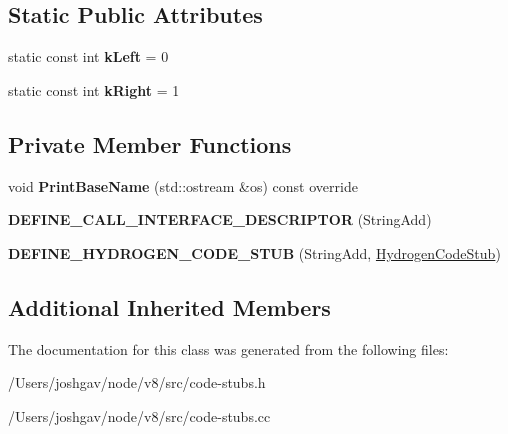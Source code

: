 \subsection*{Static Public Attributes}
\begin{DoxyCompactItemize}
\item 
static const int {\bfseries k\+Left} = 0\hypertarget{classv8_1_1internal_1_1_string_add_stub_aedec92cef9fe651badc00f785613507c}{}\label{classv8_1_1internal_1_1_string_add_stub_aedec92cef9fe651badc00f785613507c}

\item 
static const int {\bfseries k\+Right} = 1\hypertarget{classv8_1_1internal_1_1_string_add_stub_a3ef9ccabf822b5f268695dcef796986e}{}\label{classv8_1_1internal_1_1_string_add_stub_a3ef9ccabf822b5f268695dcef796986e}

\end{DoxyCompactItemize}
\subsection*{Private Member Functions}
\begin{DoxyCompactItemize}
\item 
void {\bfseries Print\+Base\+Name} (std\+::ostream \&os) const  override\hypertarget{classv8_1_1internal_1_1_string_add_stub_a0a40958af7dfdf76e13f60add829154d}{}\label{classv8_1_1internal_1_1_string_add_stub_a0a40958af7dfdf76e13f60add829154d}

\item 
{\bfseries D\+E\+F\+I\+N\+E\+\_\+\+C\+A\+L\+L\+\_\+\+I\+N\+T\+E\+R\+F\+A\+C\+E\+\_\+\+D\+E\+S\+C\+R\+I\+P\+T\+OR} (String\+Add)\hypertarget{classv8_1_1internal_1_1_string_add_stub_ad739e0a70ff0b1e53281c50dd2f80be4}{}\label{classv8_1_1internal_1_1_string_add_stub_ad739e0a70ff0b1e53281c50dd2f80be4}

\item 
{\bfseries D\+E\+F\+I\+N\+E\+\_\+\+H\+Y\+D\+R\+O\+G\+E\+N\+\_\+\+C\+O\+D\+E\+\_\+\+S\+T\+UB} (String\+Add, \hyperlink{classv8_1_1internal_1_1_hydrogen_code_stub}{Hydrogen\+Code\+Stub})\hypertarget{classv8_1_1internal_1_1_string_add_stub_a3dbc6cdc8cdbfc3f38935469e0a9fe68}{}\label{classv8_1_1internal_1_1_string_add_stub_a3dbc6cdc8cdbfc3f38935469e0a9fe68}

\end{DoxyCompactItemize}
\subsection*{Additional Inherited Members}


The documentation for this class was generated from the following files\+:\begin{DoxyCompactItemize}
\item 
/\+Users/joshgav/node/v8/src/code-\/stubs.\+h\item 
/\+Users/joshgav/node/v8/src/code-\/stubs.\+cc\end{DoxyCompactItemize}
